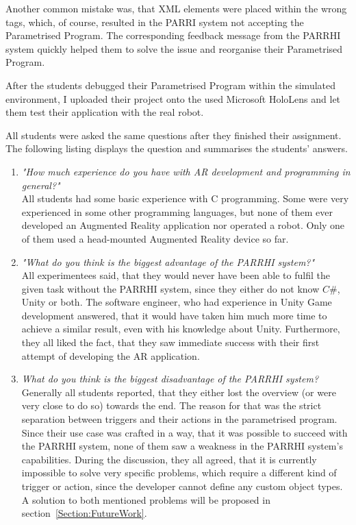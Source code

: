 Another common mistake was, that XML elements were placed within the wrong tags, which, of course, resulted in the PARRI system not accepting the Parametrised Program. The corresponding feedback message from the PARRHI system quickly helped them to solve the issue and reorganise their Parametrised Program.

After the students debugged their Parametrised Program within the simulated environment, I uploaded their project onto the used Microsoft HoloLens and let them test their application with the real robot.

All students were asked the same questions after they finished their assignment. The following listing displays the question and summarises the students' answers.
\begin{enumerate}
	\item \textit{"How much experience do you have with AR development and programming in general?"}\\
	All students had some basic experience with C programming. Some were very experienced in some other programming languages, but none of them ever developed an Augmented Reality application nor operated a robot. Only one of them used a head-mounted Augmented Reality device so far.
	\item \textit{"What do you think is the biggest advantage of the PARRHI system?"}\\
	All experimentees said, that they would never have been able to fulfil the given task without the PARRHI system, since they either do not know $C\#$, Unity or both. The software engineer, who had experience in Unity Game development answered, that it would have taken him much more time to achieve a similar result, even with his knowledge about Unity. Furthermore, they all liked the fact, that they saw immediate success with their first attempt of developing the AR application.
	\item \textit{What do you think is the biggest disadvantage of the PARRHI system?}\\
	Generally all students reported, that they either lost the overview (or were very close to do so) towards the end. The reason for that was the strict separation between triggers and their actions in the parametrised program.
	\\Since their use case was crafted in a way, that it was possible to succeed with the PARRHI system, none of them saw a weakness in the PARRHI system's capabilities. During the discussion, they all agreed, that it is currently impossible to solve very specific problems, which require a different kind of trigger or action, since the developer cannot define any custom object types.\\A solution to both mentioned problems will be proposed in section~\ref{Section:FutureWork}.
\end{enumerate}
 
